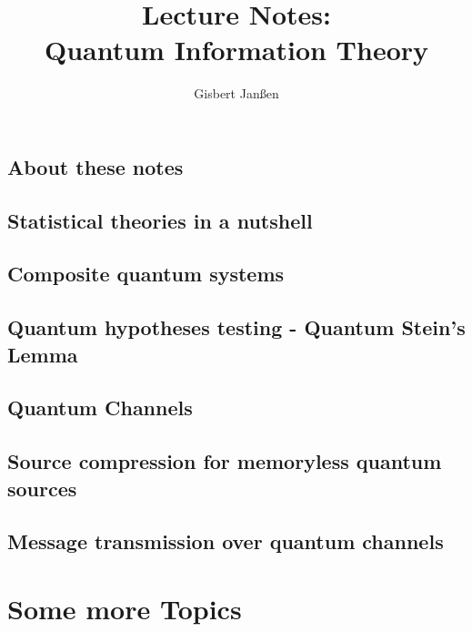 \documentclass[a4paper, 11pt]{memoir}
\author{Gisbert Jan\ss en}
\title{Lecture Notes: \\ Quantum Information Theory}
\begin{document}
\maketitle
\tableofcontents



\chapter*{About these notes}
\label{chap:about}



\chapter{Statistical theories in a nutshell}
\label{chap:stat_th}
 


\chapter{Composite quantum systems}
\label{chap:comp_sys}
 


\chapter{Quantum hypotheses testing - Quantum Stein's Lemma}
\label{chap:hypotheses_tests}
 


\chapter{Quantum Channels}
\label{chap:quantum_channels}
 


\chapter{Source compression for memoryless quantum sources}
\label{chap:source_comp}
 


\chapter{Message transmission over quantum channels}
\label{chap:channel_cod}
 


\part{Some more Topics}
\end{document}
